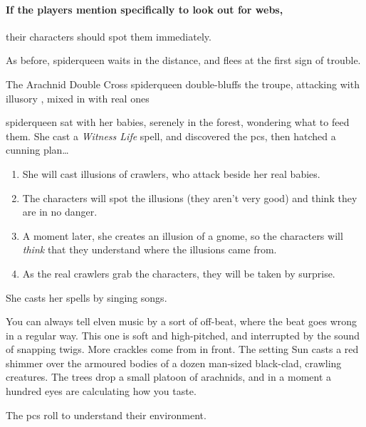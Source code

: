 \paragraph{If the players mention specifically to look out for webs,}
their characters should spot them immediately.


As before, \gls{spiderqueen} waits in the distance, and flees at the first sign of trouble.

{The Arachnid Double Cross}%
{\Gls{spiderqueen} double-bluffs the troupe, attacking with illusory , mixed in with real ones}%
\label{spiderqueenssong}

\Gls{spiderqueen} sat with her babies, serenely in the forest, wondering what to feed them.
She cast a \textit{Witness Life} spell, and discovered the \glspl{pc}, then hatched a cunning plan\ldots

\begin{enumerate}
  \item
    She will cast illusions of \glspl{crawler}, who attack beside her real babies.
  \item
  The characters will spot the illusions (they aren't very good) and think they are in no danger.
  \item
  A moment later, she creates an illusion of a gnome, so the characters will \emph{think} that they understand where the illusions came from.
  \item
  As the real \glspl{crawler} grab the characters, they will be taken by surprise.
\end{enumerate}

She casts her \glspl{spell} by singing songs.

\begin{boxtext}
  You can always tell elven music by a sort of off-beat, where the beat goes wrong in a regular way.
  This one is soft and high-pitched, and interrupted by the sound of snapping twigs.
  More crackles come from in front.
  The setting Sun casts a red shimmer over the armoured bodies of a dozen man-sized black-clad, crawling creatures.
  The trees drop a small platoon of arachnids, and in a moment a hundred eyes are calculating how you taste.
\end{boxtext}

The \glspl{pc} roll  to understand their environment.

